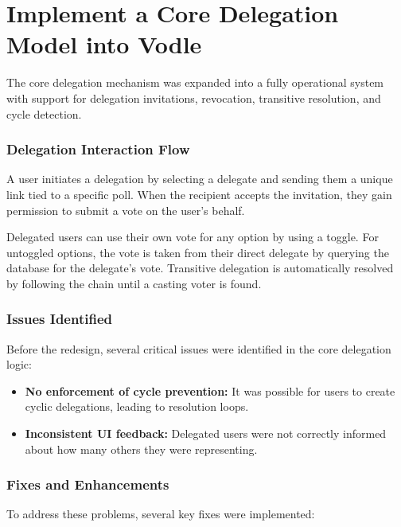 \section{Implement a Core Delegation Model into Vodle}

The core delegation mechanism was expanded into a fully operational system with support for delegation invitations, revocation, transitive resolution, and cycle detection.

\subsubsection{Delegation Interaction Flow}

A user initiates a delegation by selecting a delegate and sending them a unique link tied to a specific poll. When the recipient accepts the invitation, they gain permission to submit a vote on the user's behalf.

Delegated users can use their own vote for any option by using a toggle. For untoggled options, the vote is taken from their direct delegate by querying the database for the delegate's vote. Transitive delegation is automatically resolved by following the chain until a casting voter is found.


\subsubsection{Issues Identified}

Before the redesign, several critical issues were identified in the core delegation logic:

\begin{itemize}
    \item \textbf{No enforcement of cycle prevention:} It was possible for users to create cyclic delegations, leading to resolution loops.
    \item \textbf{Inconsistent UI feedback:} Delegated users were not correctly informed about how many others they were representing.
\end{itemize}

\subsubsection{Fixes and Enhancements}
To address these problems, several key fixes were implemented:

